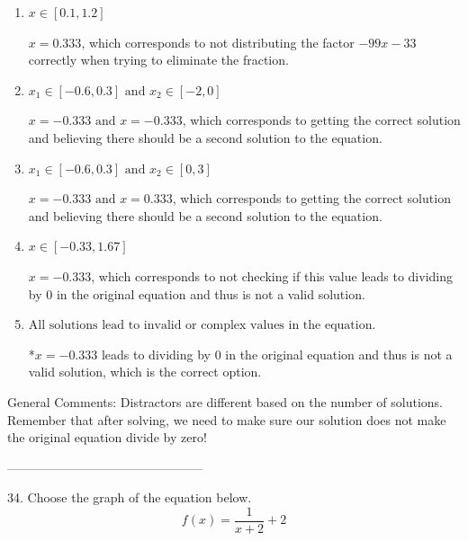 \documentclass{extbook}[14pt]
\begin{document}
\begin{enumerate}[label=\Alph*.] 
\item $ x \in [0.1,1.2] $ 

 $x = 0.333$, which corresponds to not distributing the factor $-99x -33$ correctly when trying to eliminate the fraction. 
\item $ x_1 \in [-0.6, 0.3] \text{ and } x_2 \in [-2,0] $ 

 $x = -0.333 \text{ and } x = -0.333$, which corresponds to getting the correct solution and believing there should be a second solution to the equation. 
\item $ x_1 \in [-0.6, 0.3] \text{ and } x_2 \in [0,3] $ 

 $x = -0.333 \text{ and } x = 0.333$, which corresponds to getting the correct solution and believing there should be a second solution to the equation. 
\item $ x \in [-0.33,1.67] $ 

 $x = -0.333$, which corresponds to not checking if this value leads to dividing by 0 in the original equation and thus is not a valid solution. 
\item $ \text{All solutions lead to invalid or complex values in the equation.} $ 

 *$x = -0.333$ leads to dividing by 0 in the original equation and thus is not a valid solution, which is the correct option. 
\end{enumerate} 
 
General Comments: Distractors are different based on the number of solutions. Remember that after solving, we need to make sure our solution does not make the original equation divide by zero!

-----------------------------------------------

34. Choose the graph of the equation below.
\[ f(x) = \frac{1}{x + 2} + 2 \] 
\end{document}

